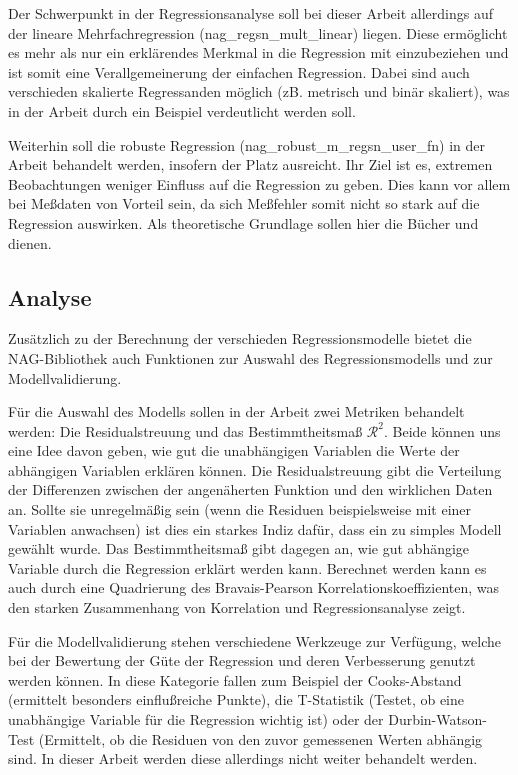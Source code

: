 \documentclass{article}
\begin{document}
Der Schwerpunkt in der Regressionsanalyse soll bei dieser Arbeit allerdings auf der lineare Mehrfachregression (nag\_regsn\_mult\_linear) liegen.
Diese ermöglicht es mehr als nur ein erklärendes Merkmal in die Regression mit einzubeziehen und ist somit eine Verallgemeinerung der einfachen Regression.
Dabei sind auch verschieden skalierte Regressanden möglich (zB. metrisch und binär skaliert), was in der Arbeit durch ein Beispiel verdeutlicht werden soll.

Weiterhin soll die robuste Regression (nag\_robust\_m\_regsn\_user\_fn) in der Arbeit behandelt werden, insofern der Platz ausreicht.
Ihr Ziel ist es, extremen Beobachtungen weniger Einfluss auf die Regression zu geben.
Dies kann vor allem bei Meßdaten von Vorteil sein, da sich Meßfehler somit nicht so stark auf die Regression auswirken.
Als theoretische Grundlage sollen hier die Bücher \cite{Hampel1986} und \cite{Huber1981} dienen.


\subsection{Analyse}

Zusätzlich zu der Berechnung der verschieden Regressionsmodelle bietet die NAG-Bibliothek auch Funktionen zur Auswahl des Regressionsmodells und zur Modellvalidierung.

Für die Auswahl des Modells sollen in der Arbeit zwei Metriken behandelt werden: Die Residualstreuung und das Bestimmtheitsmaß $\mathcal{R}^2$.
Beide können uns eine Idee davon geben, wie gut die unabhängigen Variablen die Werte der abhängigen Variablen erklären können.
Die Residualstreuung gibt die Verteilung der Differenzen zwischen der angenäherten Funktion und den wirklichen Daten an.
Sollte sie unregelmäßig sein (wenn die Residuen beispielsweise mit einer Variablen anwachsen) ist dies ein starkes Indiz dafür, dass ein zu simples Modell gewählt wurde. 
Das Bestimmtheitsmaß gibt dagegen an, wie gut abhängige Variable durch die Regression erklärt werden kann.
Berechnet werden kann es auch durch eine Quadrierung des Bravais-Pearson Korrelationskoeffizienten, was den starken Zusammenhang von Korrelation und Regressionsanalyse zeigt.

Für die Modellvalidierung stehen verschiedene Werkzeuge zur Verfügung, welche bei der Bewertung der Güte der Regression und deren Verbesserung genutzt werden können.
In diese Kategorie fallen zum Beispiel der Cooks-Abstand (ermittelt besonders einflußreiche Punkte), die T-Statistik (Testet, ob eine unabhängige Variable für die Regression wichtig ist) oder der Durbin-Watson-Test (Ermittelt, ob die Residuen von den zuvor gemessenen Werten abhängig sind.
In dieser Arbeit werden diese allerdings nicht weiter behandelt werden.
\end{document}
